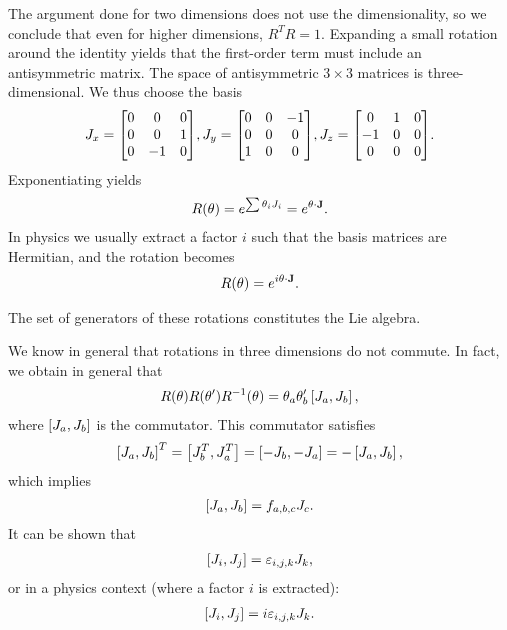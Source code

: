 The argument done for two dimensions does not use the dimensionality, so we conclude that even for higher dimensions, $R^{T}R = 1$. Expanding a small rotation around the identity yields that the first-order term must include an antisymmetric matrix. The space of antisymmetric $3\times 3$ matrices is three-dimensional. We thus choose the basis
\begin{align*}
J_{x} =
\mqty[
0 & 0  & 0 \\
0 & 0  & 1 \\
0 & -1 & 0
],
J_{y} =
\mqty[
0 & 0 & -1 \\
0 & 0 & 0  \\
1 & 0 & 0
],
J_{z} =
\mqty[
0  & 1 & 0 \\
-1 & 0 & 0 \\
0  & 0 & 0
].
\end{align*}
Exponentiating yields
\begin{align*}
R(\theta) = e^{\sum \theta_{i}J_{i}} = e^{\vb{\theta}\cdot\vb{J}}.
\end{align*}
In physics we usually extract a factor $i$ such that the basis matrices are Hermitian, and the rotation becomes
\begin{align*}
R(\theta) = e^{i\vb{\theta}\cdot\vb{J}}.
\end{align*}

The set of generators of these rotations constitutes the Lie algebra.

We know in general that rotations in three dimensions do not commute. In fact, we obtain in general that
\begin{align*}
R(\vb{\theta})R(\vb{\theta}')R^{-1}(\vb{\theta}) = \theta_{a}\theta_{b}'\left[J_{a}, J_{b}\right],
\end{align*}
where $\left[J_{a}, J_{b}\right]$ is the commutator. This commutator satisfies
\begin{align*}
\left[J_{a}, J_{b}\right]^{T} = \left[J_{b}^{T}, J_{a}^{T}\right] = \left[-J_{b}, -J_{a}\right] = -\left[J_{a}, J_{b}\right],
\end{align*}
which implies
\begin{align*}
\left[J_{a}, J_{b}\right] = f_{a,b,c}J_{c}.
\end{align*}
It can be shown that
\begin{align*}
\left[J_{i}, J_{j}\right] = \varepsilon_{i,j,k}J_{k},
\end{align*}
or in a physics context (where a factor $i$ is extracted):
\begin{align*}
\left[J_{i}, J_{j}\right] = i\varepsilon_{i,j,k}J_{k}.
\end{align*}